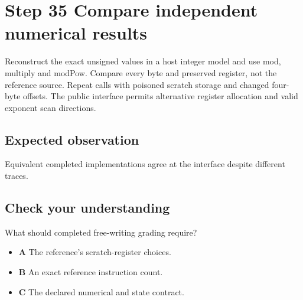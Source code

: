 \section{Step 35 Compare independent numerical results}\label{rsa-s35}

Reconstruct the exact unsigned values in a host integer model and use mod, multiply and modPow. Compare every byte and preserved register, not the reference source. Repeat calls with poisoned scratch storage and changed four-byte offsets. The public interface permits alternative register allocation and valid exponent scan directions.

\subsection{Expected observation}
Equivalent completed implementations agree at the interface despite different traces.

\subsection{Check your understanding}
What should completed free-writing grading require?

\begin{itemize}
\item \textbf{A} The reference's scratch-register choices.
\item \textbf{B} An exact reference instruction count.
\item \textbf{C} The declared numerical and state contract.
\end{itemize}
